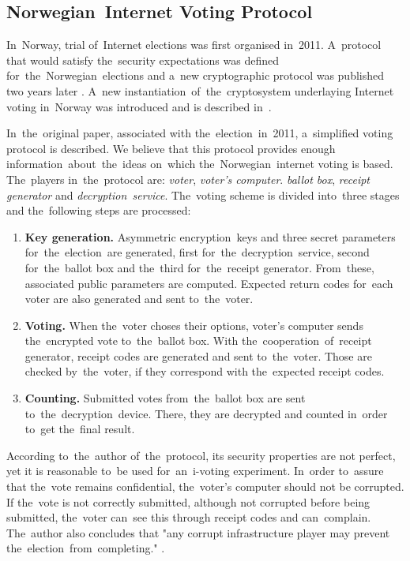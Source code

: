 \subsection{Norwegian~Internet Voting Protocol}
\label{sub:norwegian}
In~Norway, trial of~Internet elections was first organised in~2011. A~protocol that would satisfy the~security expectations was defined for~the~Norwegian~elections \cite{Gjosteen2010} and a~new cryptographic protocol was published two years later \cite{Gjosteen2012}. A~new instantiation~of~the~cryptosystem underlaying Internet voting in~Norway was introduced and is described in~\cite{Gjosteen2015}.

In~the~original paper, associated with the~election~in~2011, a~simplified voting protocol is described. We believe that this protocol provides enough information~about~the~ideas on~which the~Norwegian~internet voting is based. The~players in~the~protocol are: \emph{voter}, \emph{voter's computer}. \emph{ballot box}, \emph{receipt generator} and \emph{decryption~service}. 
\bigbreak
The~voting scheme is divided into~three stages and the~following steps are processed:
\begin{enumerate}
\item \textbf{Key generation.} %
Asymmetric encryption~keys and three secret parameters for~the~election~are generated, first for~the~decryption~service, second for~the~ballot box and the~third for~the~receipt generator. From~these, associated public parameters are computed. Expected return codes for~each voter are also generated and sent to~the~voter.
\item \textbf{Voting.} When the~voter choses their options, voter's computer sends the~encrypted vote to~the~ballot box. With the~cooperation~of~receipt generator, receipt codes are generated and sent to~the~voter. Those are checked by~the~voter, if they correspond with the~expected receipt codes.
\item \textbf{Counting.} Submitted votes from~the~ballot box are sent to~the~decryption~device. There, they are decrypted and counted in~order to~get the~final result.
\end{enumerate}

According to~the~author of~the~protocol, its security properties are not perfect, yet it is reasonable to~be used for~an~i-voting experiment. In~order to~assure that the~vote remains confidential, the~voter's computer should not be corrupted. If the~vote is not correctly submitted, although not corrupted before being submitted, the~voter can~see this through receipt codes and can~complain. The~author also concludes that "any corrupt infrastructure player may prevent the~election~from~completing." \cite{Gjosteen2010}.

